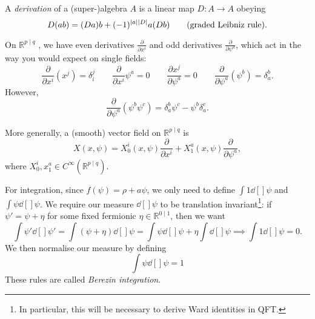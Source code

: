 \begin{definition}[derivation]
  A \emph{derivation} of a (super-)algebra $A$ is a linear map $D: A \to A$ obeying
  \begin{equation}
    D(ab) = (Da) b + (-1)^{\abs{a} \abs{D}} a (Db) \qquad (\text{graded Leibniz rule}).
  \end{equation}
\end{definition}

\begin{example}[]
  On $\mathbb{R}^{p \mid q}$ , we have even derivatives $\frac{\partial}{\partial x^{i}}$  and odd derivatives $\frac{\partial }{\partial \psi^{a}}$, which act in the way you would expect on single fields:
  \begin{equation}
    \frac{\partial }{\partial x^{i}} (x^{j}) = \delta^{j}_{i} \qquad \frac{\partial }{\partial x^{i}} \psi^{a} = 0 \qquad \frac{\partial x^{j}}{\partial \psi^{a}} = 0 \qquad \frac{\partial }{\partial \psi^{a}} (\psi^{b}) = \delta_{a}^{b}.
  \end{equation}
  However, 
  \begin{equation}
    \frac{\partial }{\partial \psi^{a}} (\psi^{b} \psi^{c}) = \delta^{b}_{a} \psi^{c} - \psi^{b} \delta^{c}_{a}.
  \end{equation}
\end{example}

More generally, a (smooth) vector field on $\mathbb{R}^{p \mid q}$  is 
\begin{equation}
  X(x, \psi) = X^{i}_0 (x, \psi) \frac{\partial }{\partial x^{i}} + X^{a}_1(x, \psi) \frac{\partial }{\partial \psi^{a}}, 
\end{equation}
where $X^{i}_0, x^{a}_1 \in C^\infty(\mathbb{R}^{p \mid q})$.

For integration, since $f(\psi) = \rho + a \psi$, we only need to define $\int 1 \dd[]{\psi}$ and $\int \psi \dd[]{\psi}$.
We require our measure $\dd[]{\psi}$ to be translation invariant\footnote{In particular, this will be necessary to derive Ward identities in QFT.}: if $\psi' = \psi + \eta$ for some fixed fermionic $\eta \in \mathbb{R}^{0 \mid 1}$, then  we want 
\begin{equation}
  \int \psi' \dd[]{\psi'} = \int (\psi + \eta) \dd[]{\psi} = \int \psi \dd[]{\psi} + \eta \int \dd[]{\psi} \implies \boxed{\int 1 \dd[]{\psi} = 0}.
\end{equation}
We then normalise our measure by defining
 \begin{equation}
  \boxed{\int \psi \dd[]{\psi} = 1}
\end{equation}
These rules are called \emph{Berezin integration}.

